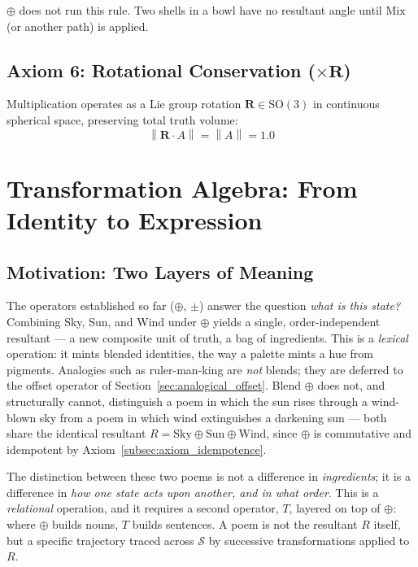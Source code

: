 \documentclass[12pt, a4paper]{article}
\providecommand{\norm}[1]{\left\lVert#1\right\rVert}
\begin{document}
$\oplus$ does not run this rule. Two shells in a bowl have no
resultant angle until $\mathrm{Mix}$ (or another path) is applied.

\subsection{Axiom 6: Rotational Conservation (\texorpdfstring{$\times \mathbf{R}$}{x R})}
\label{subsec:axiom_rotation}
Multiplication operates as a Lie group rotation $\mathbf{R} \in \mathrm{SO}(3)$ in continuous spherical space, preserving total truth volume:
\begin{equation}
    \norm{\mathbf{R} \cdot A} = \norm{A} = 1.0
\end{equation}

\section{Transformation Algebra: From Identity to Expression}
\label{sec:transformation_algebra}

\subsection{Motivation: Two Layers of Meaning}
\label{subsec:transform_motivation}
The operators established so far ($\oplus$, $\pm$) answer the question
\emph{what is this state?} Combining Sky, Sun, and Wind under $\oplus$
yields a single, order-independent resultant --- a new composite unit
of truth, a bag of ingredients. This is a \emph{lexical} operation: it mints blended identities, the way
a palette mints a hue from pigments. Analogies such as ruler-man-king are \emph{not} blends; they are deferred to the offset operator of Section~\ref{sec:analogical_offset}. Blend $\oplus$ does not, and structurally
cannot, distinguish a poem in which the sun rises through a wind-blown
sky from a poem in which wind extinguishes a darkening sun --- both
share the identical resultant
$R = \text{Sky} \oplus \text{Sun} \oplus \text{Wind}$, since $\oplus$
is commutative and idempotent by Axiom~\ref{subsec:axiom_idempotence}.

The distinction between these two poems is not a difference in
\emph{ingredients}; it is a difference in \emph{how one state acts
upon another, and in what order}. This is a \emph{relational}
operation, and it requires a second operator, $T$, layered on top of
$\oplus$: where $\oplus$ builds nouns, $T$ builds sentences. A poem is
not the resultant $R$ itself, but a specific trajectory traced across
$\mathcal{S}$ by successive transformations applied to $R$.
\end{document}
